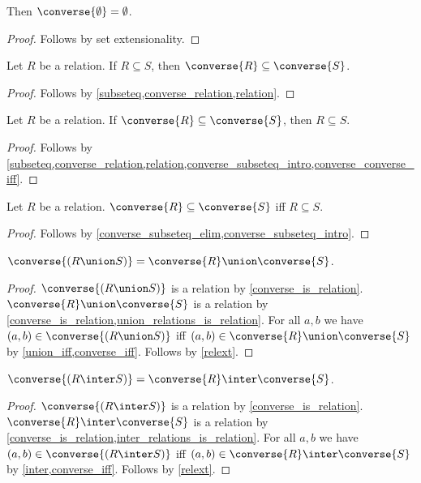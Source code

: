 \begin{proposition}\label{converse_emptyset}
    Then $\converse{\emptyset} = \emptyset$.
\end{proposition}
\begin{proof}
    Follows by set extensionality.
\end{proof}

\begin{proposition}\label{converse_subseteq_intro}
    Let $R$ be a relation.
    If $R\subseteq S$, then $\converse{R}\subseteq\converse{S}$.
\end{proposition}
\begin{proof}
    Follows by \cref{subseteq,converse_relation,relation}.
\end{proof}

\begin{proposition}\label{converse_subseteq_elim}
    Let $R$ be a relation.
    If $\converse{R}\subseteq\converse{S}$, then $R\subseteq S$.
\end{proposition}
\begin{proof}
    Follows by \cref{subseteq,converse_relation,relation,converse_subseteq_intro,converse_converse_iff}.
\end{proof}

\begin{proposition}\label{converse_subseteq_iff}
    Let $R$ be a relation.
    $\converse{R}\subseteq\converse{S}$ iff $R\subseteq S$.
\end{proposition}
\begin{proof}
    Follows by \cref{converse_subseteq_elim,converse_subseteq_intro}.
\end{proof}

\begin{proposition}\label{converse_union}
    $\converse{(R\union S)} = \converse{R}\union\converse{S}$.
\end{proposition}
\begin{proof}
    $\converse{(R\union S)}$ is a relation by \cref{converse_is_relation}.
    $\converse{R}\union\converse{S}$ is a relation by \cref{converse_is_relation,union_relations_is_relation}.
    For all $a,b$ we have $(a,b)\in\converse{(R\union S)}$ iff $(a,b)\in\converse{R}\union\converse{S}$
        by \cref{union_iff,converse_iff}.
    Follows by \cref{relext}.
\end{proof}

\begin{proposition}\label{converse_inter}
    $\converse{(R\inter S)} = \converse{R}\inter\converse{S}$.
\end{proposition}
\begin{proof}
    $\converse{(R\inter S)}$ is a relation by \cref{converse_is_relation}.
    $\converse{R}\inter\converse{S}$ is a relation by \cref{converse_is_relation,inter_relations_is_relation}.
    For all $a,b$ we have $(a,b)\in\converse{(R\inter S)}$ iff $(a,b)\in\converse{R}\inter\converse{S}$
        by \cref{inter,converse_iff}.
    Follows by \cref{relext}.
\end{proof}

